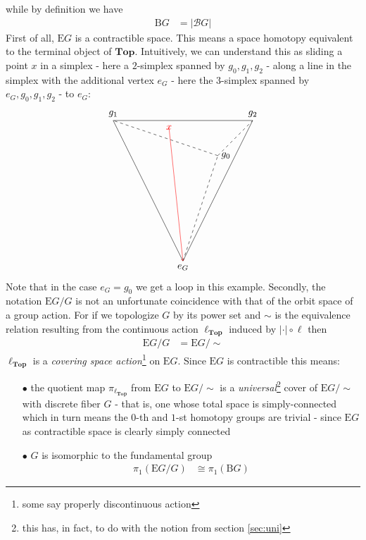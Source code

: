 while by definition we have
\begin{align*}
  \mathrm{B}G
  &=
  \vert
    \mathcal{B}G
  \vert
\end{align*}
First of all, $\mathrm{E}G$ is a contractible space. This means a space homotopy equivalent to the terminal object of $\mathbf{Top}$. Intuitively, we can understand this as sliding a point $x$ in a simplex - here a $2$-simplex spanned by $g_{0},g_{1},g_{2}$ - along a line in the simplex with the additional vertex $e_{G}$ - here the $3$-simplex spanned by $e_{G},g_{0},g_{1},g_{2}$ - to $e_{G}$:
\[
\begin{tikzpicture}[scale=1.25]
  \draw[dashed]
    (0,0) node[below] {$e_{G}$}
    --
    (1,3) node[right] {$g_{0}$};
  \draw
    (0,0)
    --
    (-2,4) node[above] {$g_{1}$};
  \draw
    (0,0)
    --
    (2,4) node[above] {$g_{2}$};
  \draw
    (-2,4)
    --
    (2,4);
  \draw[dashed]
    (1,3)
    --
    (-2,4);
  \draw[dashed]
    (1,3)
    --
    (2,4);
  \draw[->,red]
    (-0.4,3.8) node {$x$}
    --
    (0,0);
\end{tikzpicture}
\]
Note that in the case $e_{G} = g_{0}$ we get a loop in this example. Secondly, the notation  $\mathrm{E}G \slash G$ is not an unfortunate coincidence with that of the orbit space of a group action. For if we topologize $G$ by its power set and $\sim$ is the equivalence relation resulting from the continuous action $\ell_{\mathbf{Top}}$ induced by $\vert \cdot \vert \circ \ell$ then
\begin{align*}
  \mathrm{E}G
  \slash
  G
  &=
  \mathrm{E}G
  \slash
  \sim
\end{align*}
$\ell_{\mathbf{Top}}$ is a \textit{covering space action}\footnote{some say properly discontinuous action} on $\mathrm{E}G$. Since $\mathrm{E}G$ is contractible this means:
\begin{enumerate}
\item[$\bullet$]
the quotient map $\pi_{\ell_{\mathbf{Top}}}$ from $\mathrm{E}G$ to $\mathrm{E}G \slash \sim$ is a \textit{universal}\footnote{this has, in fact, to do with the notion from section \ref{sec:uni}} cover of $\mathrm{E}G \slash \sim$ with discrete fiber $G$ - that is, one whose total space is simply-connected which in turn means the $0$-th and $1$-st homotopy groups are trivial - since $\mathrm{E}G$ as contractible space is clearly simply connected
\item[$\bullet$]
$G$ is isomorphic to the fundamental group
\begin{align*}
  \pi_{1}(\mathrm{E}G \slash G)
  &\cong
  \pi_{1}(\mathrm{B}G)
\end{align*}
\end{enumerate}
